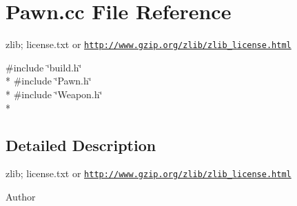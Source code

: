 \section{Pawn.\-cc File Reference}
\label{_pawn_8cc}


zlib; license.\-txt or \href{http://www.gzip.org/zlib/zlib_license.html}{\tt http\-://www.\-gzip.\-org/zlib/zlib\-\_\-license.\-html}  


{\ttfamily \#include \char`\"{}build.\-h\char`\"{}}\\*
{\ttfamily \#include \char`\"{}Pawn.\-h\char`\"{}}\\*
{\ttfamily \#include \char`\"{}Weapon.\-h\char`\"{}}\\*


\subsection{Detailed Description}
zlib; license.\-txt or \href{http://www.gzip.org/zlib/zlib_license.html}{\tt http\-://www.\-gzip.\-org/zlib/zlib\-\_\-license.\-html} \begin{DoxyAuthor}{Author}

\end{DoxyAuthor}
